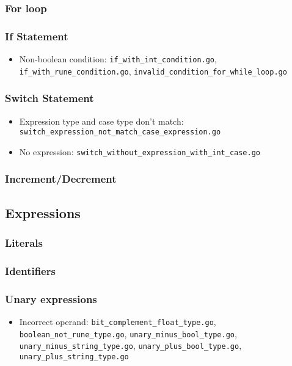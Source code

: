 \documentclass{article}
\begin{document}
\subsubsection*{For loop}
\subsubsection*{If Statement}

\begin{itemize}
\item Non-boolean condition: \texttt{if_with_int_condition.go}, \texttt{if_with_rune_condition.go}, \texttt{invalid_condition_for_while_loop.go}
\end{itemize}

\subsubsection*{Switch Statement}

\begin{itemize}
\item Expression type and case type don't match: \texttt{switch_expression_not_match_case_expression.go}
\item No expression: \texttt{switch_without_expression_with_int_case.go}
\end{itemize}

\subsubsection*{Increment/Decrement}

\subsection*{Expressions}

\subsubsection*{Literals}
\subsubsection*{Identifiers}
\subsubsection*{Unary expressions}

\begin{itemize}
\item Incorrect operand: \texttt{bit_complement_float_type.go}, \texttt{boolean_not_rune_type.go}, \texttt{unary_minus_bool_type.go}, \texttt{unary_minus_string_type.go}, \texttt{unary_plus_bool_type.go}, \texttt{unary_plus_string_type.go}
\end{itemize}
\end{document}
